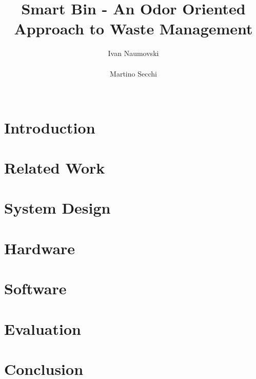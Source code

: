 \documentclass{sigchi}
\begin{document}
\title{Smart Bin - An Odor Oriented Approach to Waste Management}

\author{
  \alignauthor Ivan Naumovski\\
    \\
  \alignauthor Martino Secchi\\
    \\
}

\maketitle

\begin{abstract}

\end{abstract}




\section{Introduction}


\section{Related Work}


\section{System Design}


\section{Hardware}


\section{Software}


\section{Evaluation}


\section{Conclusion}




\end{document}
